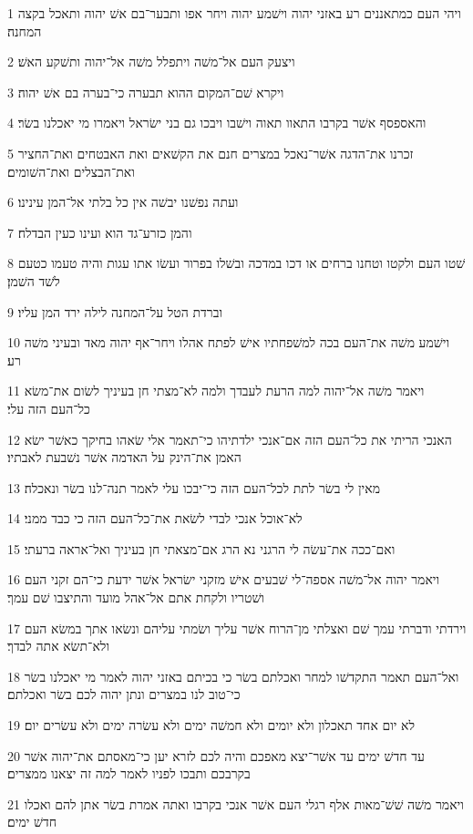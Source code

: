 \par 1 ויהי העם כמתאננים רע באזני יהוה וישׁמע יהוה ויחר אפו ותבער־בם אשׁ יהוה ותאכל בקצה המחנה׃
\par 2 ויצעק העם אל־משׁה ויתפלל משׁה אל־יהוה ותשׁקע האשׁ׃
\par 3 ויקרא שׁם־המקום ההוא תבערה כי־בערה בם אשׁ יהוה׃
\par 4 והאספסף אשׁר בקרבו התאוו תאוה וישׁבו ויבכו גם בני ישׂראל ויאמרו מי יאכלנו בשׂר׃
\par 5 זכרנו את־הדגה אשׁר־נאכל במצרים חנם את הקשׁאים ואת האבטחים ואת־החציר ואת־הבצלים ואת־השׁומים׃
\par 6 ועתה נפשׁנו יבשׁה אין כל בלתי אל־המן עינינו׃
\par 7 והמן כזרע־גד הוא ועינו כעין הבדלח׃
\par 8 שׁטו העם ולקטו וטחנו ברחים או דכו במדכה ובשׁלו בפרור ועשׂו אתו עגות והיה טעמו כטעם לשׁד השׁמן׃
\par 9 וברדת הטל על־המחנה לילה ירד המן עליו׃
\par 10 וישׁמע משׁה את־העם בכה למשׁפחתיו אישׁ לפתח אהלו ויחר־אף יהוה מאד ובעיני משׁה רע׃
\par 11 ויאמר משׁה אל־יהוה למה הרעת לעבדך ולמה לא־מצתי חן בעיניך לשׂום את־משׂא כל־העם הזה עלי׃
\par 12 האנכי הריתי את כל־העם הזה אם־אנכי ילדתיהו כי־תאמר אלי שׂאהו בחיקך כאשׁר ישׂא האמן את־הינק על האדמה אשׁר נשׁבעת לאבתיו׃
\par 13 מאין לי בשׂר לתת לכל־העם הזה כי־יבכו עלי לאמר תנה־לנו בשׂר ונאכלה׃
\par 14 לא־אוכל אנכי לבדי לשׂאת את־כל־העם הזה כי כבד ממני׃
\par 15 ואם־ככה את־עשׂה לי הרגני נא הרג אם־מצאתי חן בעיניך ואל־אראה ברעתי׃
\par 16 ויאמר יהוה אל־משׁה אספה־לי שׁבעים אישׁ מזקני ישׂראל אשׁר ידעת כי־הם זקני העם ושׁטריו ולקחת אתם אל־אהל מועד והתיצבו שׁם עמך׃
\par 17 וירדתי ודברתי עמך שׁם ואצלתי מן־הרוח אשׁר עליך ושׂמתי עליהם ונשׂאו אתך במשׂא העם ולא־תשׂא אתה לבדך׃
\par 18 ואל־העם תאמר התקדשׁו למחר ואכלתם בשׂר כי בכיתם באזני יהוה לאמר מי יאכלנו בשׂר כי־טוב לנו במצרים ונתן יהוה לכם בשׂר ואכלתם׃
\par 19 לא יום אחד תאכלון ולא יומים ולא חמשׁה ימים ולא עשׂרה ימים ולא עשׂרים יום׃
\par 20 עד חדשׁ ימים עד אשׁר־יצא מאפכם והיה לכם לזרא יען כי־מאסתם את־יהוה אשׁר בקרבכם ותבכו לפניו לאמר למה זה יצאנו ממצרים׃
\par 21 ויאמר משׁה שׁשׁ־מאות אלף רגלי העם אשׁר אנכי בקרבו ואתה אמרת בשׂר אתן להם ואכלו חדשׁ ימים׃
